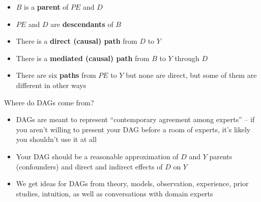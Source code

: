 \documentclass{beamer}
\begin{document}
\begin{frame}[plain]

  \begin{center}
  \end{center}

  \bigskip
  \begin{itemize}
    \item $B$ is a \textbf{parent} of $PE$ and $D$
    \item $PE$ and $D$ are \textbf{descendants} of $B$
    \item There is a \textbf{direct (causal) path} from $D$ to $Y$
    \item There is a \textbf{mediated (causal) path} from $B$ to $Y$ through $D$
    \item There are six \textbf{paths} from $PE$ to $Y$ but none are direct, but some of them are different in other ways
  \end{itemize}
\end{frame}





\begin{frame}{Where do DAGs come from?}

	\begin{itemize}
	\item DAGs are meant to represent ``contemporary agreement among experts'' -- if you aren't willing to present your DAG before a room of experts, it's likely you shouldn't use it at all
	\item Your DAG should be a reasonable approximation of $D$ and $Y$ parents (confounders) and direct and indirect effects of $D$ on $Y$
	\item We get ideas for DAGs from theory, models, observation, experience, prior studies, intuition, as well as conversations with domain experts
	\end{itemize}

\end{frame}
\end{document}
